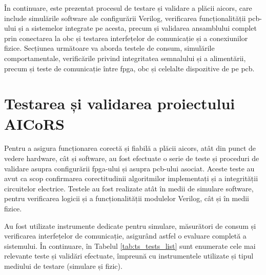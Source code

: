 \documentclass[12pt,a4paper]{report}
\begin{document}
În continuare, este prezentat procesul de testare și validare a plăcii \gls{aicors}, care include simulările software ale configurării Verilog, verificarea funcționalității \gls{pcb}-ului și a sistemelor integrate pe acesta, precum și validarea ansamblului complet prin conectarea la \gls{obc} și testarea interfețelor de comunicație și a conexiunilor fizice. Secțiunea următoare va aborda testele de consum, simulările comportamentale, verificările privind integritatea semnalului și a alimentării, precum și teste de comunicație între \gls{fpga}, \gls{obc} și celelalte dispozitive de pe \gls{pcb}.


\chapter{Testarea și validarea proiectului AICoRS}
Pentru a asigura funcționarea corectă și fiabilă a plăcii \gls{aicors}, atât din punct de vedere hardware, cât și software, au fost efectuate o serie de teste și proceduri de validare asupra configurării \gls{fpga}-ului și asupra \gls{pcb}-ului asociat. Aceste teste au avut ca scop confirmarea corectitudinii algoritmilor implementați și a integrității circuitelor electrice. Testele au fost realizate atât în medii de simulare software, pentru verificarea logicii și a funcționalității modulelor Verilog, cât și în medii fizice. 

Au fost utilizate instrumente dedicate pentru simulare, măsurători de consum și verificarea interfețelor de comunicație, asigurând astfel o evaluare completă a sistemului. În continuare, în Tabelul \ref{tab:ts_tests_list} sunt enumerate cele mai relevante teste și validări efectuate, împreună cu instrumentele utilizate și tipul mediului de testare (simulare și fizic). 
\end{document}
